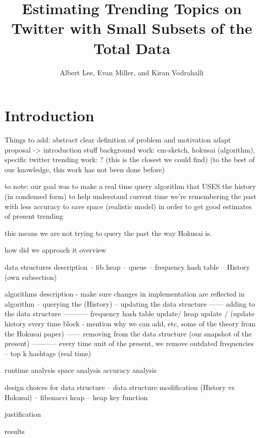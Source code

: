 \documentclass[a4paper,12pt]{article}
\begin{document}
\title{Estimating Trending Topics on Twitter with Small Subsets of the Total Data}

\author{Albert Lee, Evan Miller, and Kiran Vodrahalli}

\maketitle

\section{Introduction}


Things to add:
abstract
clear definition of problem and motivation 
adapt proposal -> introduction stuff
background work: cm-sketch, hokusai (algorithm), specific twitter trending work: ? 
(this is the closest we could find)
(to the best of our knowledge, this work has not been done before)

to note: our goal was to make a real time query algorithm that USES
the history (in condensed form) to help understand current time 
we're remembering the past with less accuracy to save space (realistic model)
in order to get good estimates of present trending

this means we are not trying to query the past the way Hokusai is.

how did we approach it 
overview

data structures
description
-- fib heap
-- queue
-- frequency hash table
-- History (own subsection)

algorithms
description
- make sure changes in implementation are reflected in algorithm 
-- querying the (History)
-- updating the data structure
------ adding to the data structure
----------- frequency hash table update/ heap update / (update history every time block - mention why we can add, etc, some of the theory from the Hokusai paper)
------ removing from the data structure (our snapshot of the present)
----------- every time unit of the present, we remove outdated frequencies
-- top k hashtags (real time)

runtime analysis
space analysis
accuracy analysis

design choices for data structure
-- data structure modification (History vs Hokusai)
-- fibonacci heap 
-- heap key function 

justification


results
\end{document}
